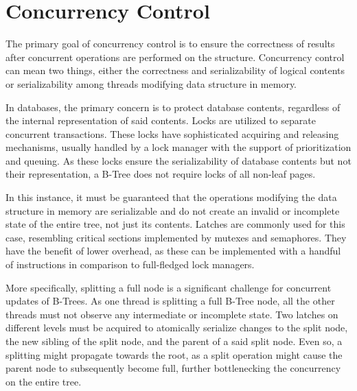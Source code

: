 \section{Concurrency Control}

The primary goal of concurrency control is to ensure the correctness of results after concurrent operations are performed on the structure. Concurrency control can mean two things, either the correctness and serializability of logical contents or serializability among threads modifying data structure in memory.

In databases, the primary concern is to protect database contents, regardless of the internal representation of said contents. Locks are utilized to separate concurrent transactions. These locks have sophisticated acquiring and releasing mechanisms, usually handled by a lock manager with the support of prioritization and queuing. As these locks ensure the serializability of database contents but not their representation, a B-Tree does not require locks of all non-leaf pages.

In this instance, it must be guaranteed that the operations modifying the data structure in memory are serializable and do not create an invalid or incomplete state of the entire tree, not just its contents. Latches are commonly used for this case, resembling critical sections implemented by mutexes and semaphores. They have the benefit of lower overhead, as these can be implemented with a handful of instructions in comparison to full-fledged lock managers.

More specifically, splitting a full node is a significant challenge for concurrent updates of B-Trees. As one thread is splitting a full B-Tree node, all the other threads must not observe any intermediate or incomplete state. Two latches on different levels must be acquired to atomically serialize changes to the split node, the new sibling of the split node, and the parent of a said split node. Even so, a splitting might propagate towards the root, as a split operation might cause the parent node to subsequently become full, further bottlenecking the concurrency on the entire tree.